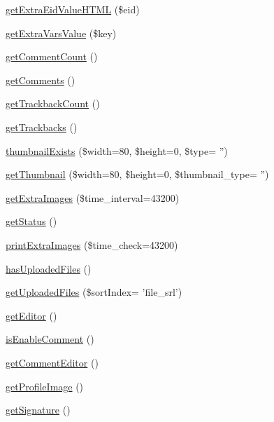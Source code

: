 \begin{DoxyCompactItemize}
\item 
\hyperlink{classdocumentItem_a52091af79c2df80f8f3c75e37adc2000}{get\-Extra\-Eid\-Value\-H\-T\-M\-L} (\$eid)
\item 
\hyperlink{classdocumentItem_ab555cb21a9a50d683836b8d4604d47f5}{get\-Extra\-Vars\-Value} (\$key)
\item 
\hyperlink{classdocumentItem_a9ed429fc56e6f95ef097645c772aa4e5}{get\-Comment\-Count} ()
\item 
\hyperlink{classdocumentItem_ad85b3da641f8bd477963d7290383e6be}{get\-Comments} ()
\item 
\hyperlink{classdocumentItem_af1520e91e8dd49202cfb93909db61c48}{get\-Trackback\-Count} ()
\item 
\hyperlink{classdocumentItem_a0c69601e59c290048081bf8d8aa7602e}{get\-Trackbacks} ()
\item 
\hyperlink{classdocumentItem_a3a8615b0ed43420047a75fb6cb719d86}{thumbnail\-Exists} (\$width=80, \$height=0, \$type= '')
\item 
\hyperlink{classdocumentItem_a033dd804282c738052af3347e9816ef4}{get\-Thumbnail} (\$width=80, \$height=0, \$thumbnail\-\_\-type= '')
\item 
\hyperlink{classdocumentItem_a0f72df4345359453aa01ff1490071c5a}{get\-Extra\-Images} (\$time\-\_\-interval=43200)
\item 
\hyperlink{classdocumentItem_aa750ee0716698bf29c9690382b7fa3ef}{get\-Status} ()
\item 
\hyperlink{classdocumentItem_a9d185a16e4439823e7e4871c2fb0659a}{print\-Extra\-Images} (\$time\-\_\-check=43200)
\item 
\hyperlink{classdocumentItem_af031d09271c9099d26b6619f9c436f68}{has\-Uploaded\-Files} ()
\item 
\hyperlink{classdocumentItem_a47ef433ba4e5147842df6c83f341d5d4}{get\-Uploaded\-Files} (\$sort\-Index= 'file\-\_\-srl')
\item 
\hyperlink{classdocumentItem_a26477197e85301bc88e35157fdcb7482}{get\-Editor} ()
\item 
\hyperlink{classdocumentItem_aff71a0f39ddc720c21c5cf39805b31a8}{is\-Enable\-Comment} ()
\item 
\hyperlink{classdocumentItem_a59ef94b52cf1a250aa4f29990e8d376d}{get\-Comment\-Editor} ()
\item 
\hyperlink{classdocumentItem_afb95c0b0d6d9106c737d8eeb51a3c834}{get\-Profile\-Image} ()
\item 
\hyperlink{classdocumentItem_a03b199ae0def81ea3a9067bbb0186f17}{get\-Signature} ()
\item 

\end{DoxyCompactItemize}
